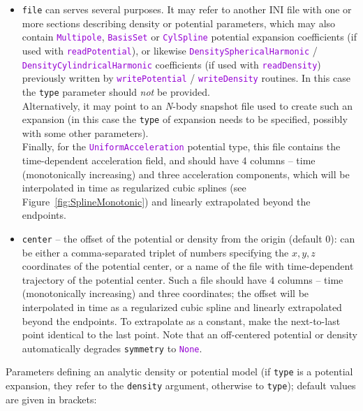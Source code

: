 \documentclass[12pt]{article}
\newcommand{\Nbody}{\textsl{N}-body\xspace}
\newcommand{\ttt}[1]{\textcolor{darkviolet}{\texttt{#1}}}
\newcommand{\ppp}[1]{\textcolor{darkolive} {\texttt{#1}}}
\begin{document}
\begin{itemize}
\item \ppp{file} can serves several purposes. It may refer to another INI file with one or more sections describing density or potential parameters, which may also contain \ttt{Multipole}, \ttt{BasisSet} or \ttt{CylSpline} potential expansion coefficients (if used with \ttt{readPotential}), or likewise \ttt{DensitySphericalHarmonic} / \ttt{DensityCylindricalHarmonic} coefficients (if used with \ttt{readDensity}) previously written by \ttt{writePotential} / \ttt{writeDensity} routines. In this case the \ppp{type} parameter should \emph{not} be provided.\\ Alternatively, it may point to an \Nbody snapshot file used to create such an expansion (in this case the \ppp{type} of expansion needs to be specified, possibly with some other parameters).\\ Finally, for the \ttt{UniformAcceleration} potential type, this file contains the time-dependent acceleration field, and should have 4 columns -- time (monotonically increasing) and three acceleration components, which will be interpolated in time as regularized cubic splines (see Figure~\ref{fig:SplineMonotonic}) and linearly extrapolated beyond the endpoints. 
\item \ppp{center} -- the offset of the potential or density from the origin (default 0): can be either a comma-separated triplet of numbers specifying the $x,y,z$ coordinates of the potential center, or a name of the file with time-dependent trajectory of the potential center. Such a file should have 4 columns -- time (monotonically increasing) and three coordinates; the offset will be interpolated in time as a regularized cubic spline and linearly extrapolated beyond the endpoints. To extrapolate as a constant, make the next-to-last point identical to the last point. Note that an off-centered potential or density automatically degrades \ppp{symmetry} to \ttt{None}.
\end{itemize}
Parameters defining an analytic density or potential model (if \ppp{type} is a potential expansion, they refer to the \ppp{density} argument, otherwise to \ppp{type}); default values are given in brackets:
\end{document}
